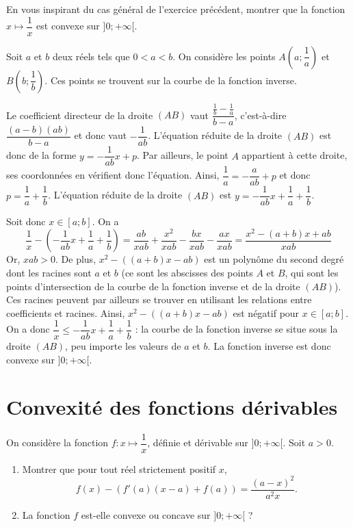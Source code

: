 \documentclass[11pt,fleqn, openany]{book} %
\begin{document}
\begin{exercise}[topic=cvx01]En vous inspirant du cas général de l'exercice précédent, montrer que la fonction $x\mapsto \dfrac{1}{x}$ est convexe sur $]0;+\infty[$.\end{exercise}

\begin{solution}Soit $a$ et $b$ deux réels tels que $0<a<b$. On considère les points $A\left(a;\dfrac{1}{a}\right)$ et $B\left(b;\dfrac{1}{b}\right)$. Ces points se trouvent sur la courbe de la fonction inverse.

Le coefficient directeur de la droite \((AB)\) vaut \(\dfrac{\frac{1}{b}-\frac{1}{a}}{b-a}\), c'est-à-dire \(\dfrac{(a-b)(ab)}{b-a}\) et donc vaut \(-\dfrac{1}{ab}\). L'équation réduite de la droite \((AB)\) est donc de la forme \(y=-\dfrac{1}{ab}x+p\). Par ailleurs, le point \(A\) appartient à cette droite, ses coordonnées en vérifient donc l'équation. Ainsi, \(\dfrac{1}{a}=-\dfrac{a}{ab}+p\) et donc \(p=\dfrac{1}{a}+\dfrac{1}{b}\). L'équation réduite de la droite \((AB)\) est \(y=-\dfrac{1}{ab}x+\dfrac{1}{a}+\dfrac{1}{b}\).

Soit donc $x\in [a;b]$. On a
\[\dfrac{1}{x}-\left(-\dfrac{1}{ab}x+\dfrac{1}{a}+\dfrac{1}{b}\right)=\dfrac{ab}{xab}+\dfrac{x^2}{xab}-\dfrac{bx}{xab}-\dfrac{ax}{xab}=\dfrac{x^2-(a+b)x+ab}{xab}\]
Or, $xab>0$. De plus, \(x^2-((a+b)x-ab)\) est un polynôme du second degré dont les racines sont \(a\) et \(b\) (ce sont les abscisses des points \(A\) et \(B\), qui sont les points d'intersection de la courbe de la fonction inverse et de la droite \((AB)\)). Ces racines peuvent par ailleurs se trouver en utilisant les relations entre coefficients et racines. Ainsi, \(x^2-((a+b)x-ab)\) est négatif pour \(x \in [a;b]\). On a donc \(\dfrac{1}{x} \leqslant -\dfrac{1}{ab}x+\dfrac{1}{a}+\dfrac{1}{b}\) : la courbe de la fonction inverse se situe sous la droite $(AB)$, peu importe les valeurs de $a$ et $b$. La fonction inverse est donc convexe sur $]0;+\infty[$.
\end{solution}



\section*{Convexité des fonctions dérivables}

\begin{exercise}[topic=cvx02]On considère la fonction $f:x\mapsto \dfrac{1}{x}$, définie et dérivable sur $]0;+\infty[$. Soit $a>0$.
\begin{enumerate}
\item Montrer que pour tout réel strictement positif $x$, 
\[f(x)-(f'(a)(x-a)+f(a))=\dfrac{(a-x)^2}{a^2x}.\]
\item La fonction $f$ est-elle convexe ou concave sur $]0;+\infty[$ ?
\end{enumerate}\end{exercise}
\end{document}

